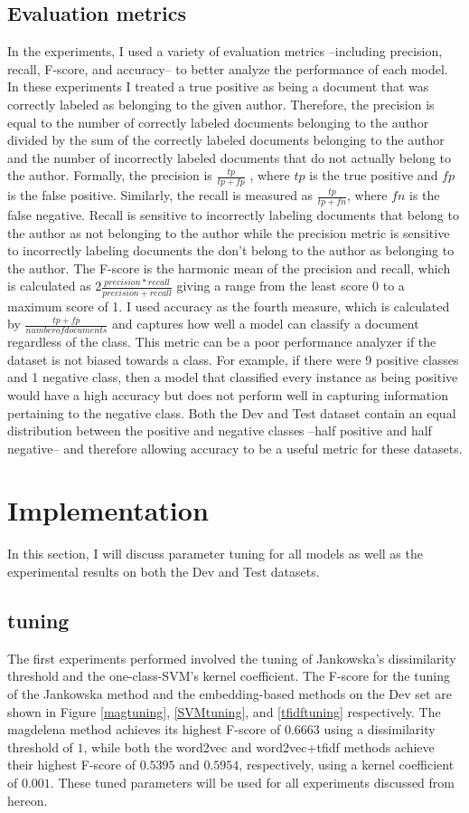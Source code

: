 \documentclass[11pt]{article}
\begin{document}
\subsection{Evaluation metrics}\label{metrics}
In the experiments, I used a variety of evaluation metrics --including precision, recall, F-score, and accuracy-- to better analyze the performance of each model. In these experiments I treated a true positive as being a document that was correctly labeled as belonging to the given author. Therefore, the precision is equal to the number of correctly labeled documents belonging to the author divided by the sum of the correctly labeled documents belonging to the author and the number of incorrectly labeled documents that do not actually belong to the author. Formally, the precision is $\frac{tp}{tp+fp}$ , where $tp$ is the true positive and $fp$ is the false positive. Similarly, the recall is measured as  $\frac{tp}{tp+fn}$, where $fn$ is the false negative. Recall is sensitive to incorrectly labeling documents that belong to the author as not belonging to the author while the precision metric is sensitive to incorrectly labeling documents the don't belong to the author as belonging to the author. The F-score is the harmonic mean of the precision and recall, which is calculated as $2\frac{precision*recall}{precision+recall}$ giving a range from the least score 0 to a maximum score of 1. I used accuracy as the fourth measure, which is calculated by $\frac{tp+fp}{number of documents}$ and captures how well a model can classify a document regardless of the class. This metric can be a poor performance analyzer if the dataset is not biased towards a class. For example, if there were 9 positive classes and 1 negative class, then a model that classified every instance as being positive would have a high accuracy but does not perform well in capturing information pertaining to the negative class. Both the Dev and Test dataset contain an equal distribution between the positive and negative classes --half positive and half negative-- and therefore  allowing accuracy to be a useful metric for these datasets.

\section{Implementation}
In this section, I will discuss parameter tuning for all models as well as the experimental results on both the Dev and Test datasets. 
\subsection{tuning}
The first experiments performed involved the tuning of Jankowska's dissimilarity threshold and the one-class-SVM's kernel coefficient. The F-score for the tuning of the Jankowska method and the embedding-based methods on the Dev set are shown in Figure \ref{magtuning}, \ref{SVMtuning}, and \ref{tfidftuning} respectively. The magdelena method achieves its highest F-score of $0.6663$ using a dissimilarity threshold of $1$, while both the word2vec and word2vec+tfidf methods achieve their highest F-score of $0.5395$ and $0.5954$, respectively, using a kernel coefficient of $0.001$. These tuned parameters will be used for all experiments discussed from hereon.
\end{document}
